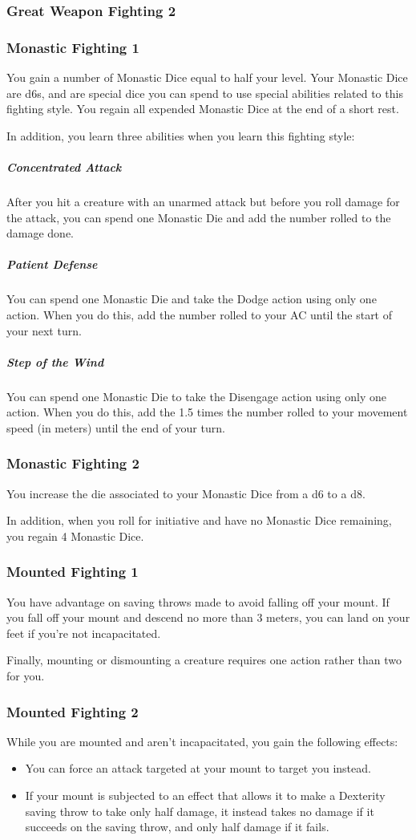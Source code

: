 \subsubsection{Great Weapon Fighting 2}
\subsubsection{Monastic Fighting 1}
    You gain a number of Monastic Dice equal to half your level.
    Your Monastic Dice are d6s, and are special dice you can spend to use special abilities related to this fighting style.
    You regain all expended Monastic Dice at the end of a short rest.

    In addition, you learn three abilities when you learn this fighting style:
    \subparagraph{Concentrated Attack} After you hit a creature with an unarmed attack but before you roll damage for the attack, you can spend one Monastic Die and add the number rolled to the damage done.
    \subparagraph{Patient Defense} You can spend one Monastic Die and take the Dodge action using only one action.
    When you do this, add the number rolled to your AC until the start of your next turn.
    \subparagraph{Step of the Wind} You can spend one Monastic Die to take the Disengage action using only one action.
    When you do this, add the 1.5 times the number rolled to your movement speed (in meters) until the end of your turn.
\subsubsection{Monastic Fighting 2}
    You increase the die associated to your Monastic Dice from a d6 to a d8.

    In addition, when you roll for initiative and have no Monastic Dice remaining, you regain 4 Monastic Dice.
\subsubsection{Mounted Fighting 1}
    You have advantage on saving throws made to avoid falling off your mount.
    If you fall off your mount and descend no more than 3 meters, you can land on your feet if you're not incapacitated.

    Finally, mounting or dismounting a creature requires one action rather than two for you.
\subsubsection{Mounted Fighting 2}
    While you are mounted and aren't incapacitated, you gain the following effects:
    \begin{itemize}
        \item You can force an attack targeted at your mount to target you instead.
        \item If your mount is subjected to an effect that allows it to make a Dexterity saving throw to take only half damage, it instead takes no damage if it succeeds on the saving throw, and only half damage if it fails.
    \end{itemize}

